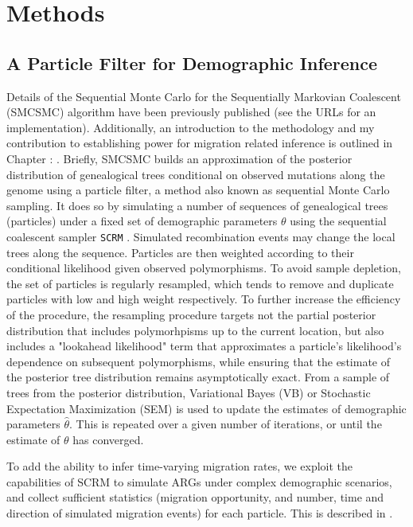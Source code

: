 \section{Methods}

\subsection{A Particle Filter for Demographic Inference} Details of the Sequential Monte Carlo for the Sequentially Markovian Coalescent (SMCSMC) algorithm have been previously published \cite{Henderson2018} (see the URLs for an implementation). Additionally, an introduction to the methodology and my contribution to establishing power for migration related inference is outlined in Chapter : . Briefly, SMCSMC builds an approximation of the posterior distribution of genealogical trees conditional on observed mutations along the genome using a particle filter, a method also known as sequential Monte Carlo sampling. It does so by simulating a number of sequences of genealogical trees (particles) under a fixed set of demographic parameters $\theta$ using the sequential coalescent sampler {\tt SCRM} \cite{Staab2015}. Simulated recombination events may change the local trees along the sequence. Particles are then weighted according to their conditional likelihood given observed polymorphisms.  To avoid sample depletion, the set of particles is regularly resampled, which tends to remove and duplicate particles with low and high weight respectively.  To further increase the efficiency of the procedure, the resampling procedure targets not the partial posterior distribution that includes polymorhpisms up to the current location, but also includes a "lookahead likelihood" term that approximates a particle's likelihood's dependence on subsequent polymorphisms, while ensuring that the estimate of the posterior tree distribution remains asymptotically exact.  From a sample of trees from the posterior distribution, Variational Bayes (VB) or Stochastic Expectation Maximization (SEM) is used to update the estimates of demographic parameters $\hat{\theta}$. This is repeated over a given number of iterations, or until the estimate of $\theta$ has converged.

To add the ability to infer time-varying migration rates, we exploit the capabilities of SCRM to simulate ARGs under complex demographic scenarios, and collect sufficient statistics (migration opportunity, and number, time and direction of simulated migration events) for each particle. This is described in .

